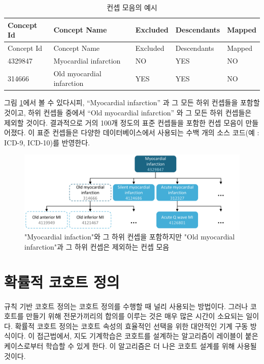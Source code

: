 \documentclass[11pt]{book}
\theoremstyle{definition}
\theoremstyle{definition}
\theoremstyle{definition}
\theoremstyle{remark}
\begin{document}
\begin{longtable}[]{@{}lllll@{}}
\caption{\label{tab:conceptSetExpression} 컨셉 모음의 예시}\tabularnewline
\toprule
Concept Id & Concept Name & Excluded & Descendants &
Mapped\tabularnewline
\midrule
\endfirsthead
\toprule
Concept Id & Concept Name & Excluded & Descendants &
Mapped\tabularnewline
\midrule
\endhead
4329847 & Myocardial infarction & NO & YES & NO\tabularnewline
314666 & Old myocardial infarction & YES & YES & NO\tabularnewline
\bottomrule
\end{longtable}

그림 \ref{fig:conceptSet}에서 볼 수 있다시피, ``Myocardial infarction''
과 그 모든 하위 컨셉들을 포함할 것이고, 하위 컨셉들 중에서 ``Old
myocardial infarction'' 와 그 모든 하위 컨셉들은 제외할 것이다.
결과적으로 거의 100개 정도의 표준 컨셉들을 포함한 컨셉 모음이
만들어졌다. 이 표준 컨셉들은 다양한 데이터베이스에서 사용되는 수백 개의
소스 코드(예 : ICD-9, ICD-10)를 반영한다.

\begin{figure}

{\centering \includegraphics[width=1\linewidth]{images/Cohorts/conceptSet} 

}

\caption{"Myocardial infaction"와 그 하위 컨셉을 포함하지만 "Old myocardial infarction"과 그 하위 컨셉은 제외하는 컨셉 모음}\label{fig:conceptSet}
\end{figure}

\section{확률적 코호트 정의}\label{--}

규칙 기반 코호트 정의는 코호트 정의를 수행할 때 널리 사용되는 방법이다.
그러나 코호트를 만들기 위해 전문가끼리의 합의를 이루는 것은 매우 많은
시간이 소요되는 일이다. 확률적 코호트 정의는 코호트 속성의 효율적인
선택을 위한 대안적인 기계 구동 방식이다. 이 접근법에서, 지도 기계학습은
코호트를 설계하는 알고리즘이 레이블이 붙은 케이스로부터 학습할 수 있게
한다. 이 알고리즘은 더 나은 코호트 설계를 위해 사용될 것이다.
\end{document}
